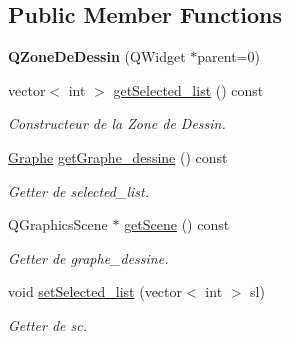 \subsection*{Public Member Functions}
\begin{DoxyCompactItemize}
\item 
\mbox{\label{classQZoneDeDessin_a938bcf40eec37bc24a1a22bb34d3b7ad}} 
{\bfseries Q\+Zone\+De\+Dessin} (Q\+Widget $\ast$parent=0)
\item 
\mbox{\label{classQZoneDeDessin_a0538fb4956eefed2c07e3a777f22bb63}} 
vector$<$ int $>$ \hyperlink{classQZoneDeDessin_a0538fb4956eefed2c07e3a777f22bb63}{get\+Selected\+\_\+list} () const
\begin{DoxyCompactList}\small\item\em Constructeur de la Zone de Dessin. \end{DoxyCompactList}\item 
\mbox{\label{classQZoneDeDessin_af1ea3c58dbc91d15bcaa04b5e87435da}} 
\hyperlink{classGraphe}{Graphe} \hyperlink{classQZoneDeDessin_af1ea3c58dbc91d15bcaa04b5e87435da}{get\+Graphe\+\_\+dessine} () const
\begin{DoxyCompactList}\small\item\em Getter de selected\+\_\+list. \end{DoxyCompactList}\item 
\mbox{\label{classQZoneDeDessin_a0284a1180127de26560beb0c7d78e801}} 
Q\+Graphics\+Scene $\ast$ \hyperlink{classQZoneDeDessin_a0284a1180127de26560beb0c7d78e801}{get\+Scene} () const
\begin{DoxyCompactList}\small\item\em Getter de graphe\+\_\+dessine. \end{DoxyCompactList}\item 
\mbox{\label{classQZoneDeDessin_a4147423afa85ff16432fc7768d45d187}} 
void \hyperlink{classQZoneDeDessin_a4147423afa85ff16432fc7768d45d187}{set\+Selected\+\_\+list} (vector$<$ int $>$ sl)
\begin{DoxyCompactList}\small\item\em Getter de sc. \end{DoxyCompactList}\item 
\mbox{\label{classQZoneDeDessin_a3700227fbb8df7218f487a0b8e311c0e}} 

\end{DoxyCompactItemize}
